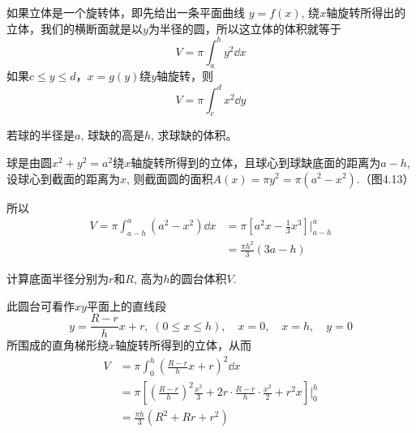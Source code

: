 如果立体是一个旋转体，即先给出一条平面曲线
$y=f(x)$, 绕$x$轴旋转所得出的立体，我们的横断面就是以$y$为半径的圆，所以这立体的体积就等于
\[V=\pi \int^b_a y^2\dd x\]
如果$c\le y\le d$，$x=g(y)$绕$y$轴旋转，则
\[V=\pi \int^d_c x^2\dd y\]


\begin{example}
若球的半径是$a$, 球缺的高是$h$, 求球缺的体积。
\end{example}

\begin{figure}[htp]
    \centering
{}
    \caption{}
\end{figure}


\begin{solution}
球是由圆$x^2+y^2=a^2$绕$x$轴旋转所得到的立体，且球心到球缺底面的距离为$a-h$, 设球心到截面的距离为$x$, 则截面圆的面积$A (x) =\pi y^2=\pi  (a^2-x^2)$.（图4.13）

所以
\[\begin{split}
    V=\pi\int^a_{a-h}(a^2-x^2)\dd x&=\pi\left[a^2 x-\frac{1}{3}x^3\right]\Bigg|^a_{a-h}\\
    &=\frac{\pi h^2}{3}(3a-h)
\end{split} \]
\end{solution}

\begin{example}
    计算底面半径分别为$r$和$R$, 高为$h$的圆台体积$V$.
\end{example}

\begin{solution}
此圆台可看作$xy$平面上的直线段
\[y=\frac{R-r}{h}x+r,\; (0\le x\le h),\quad x=0,\quad x=h,\quad y=0\]
所围成的直角梯形绕$x$轴旋转所得到的立体，从而
\[\begin{split}
    V&=\pi\int^h_0 \left(\frac{R-r}{h}x+r\right)^2 \dd x\\
    &=\pi\left[\left(\frac{R-r}{h}\right)^2\frac{x^3}{3}+2r\cdot \frac{R-r}{h}\cdot \frac{x^2}{2}+r^2 x\right]\Bigg|^h_0\\
    &=\frac{\pi h}{3}(R^2+Rr+r^2)
\end{split}\]
\end{solution}

